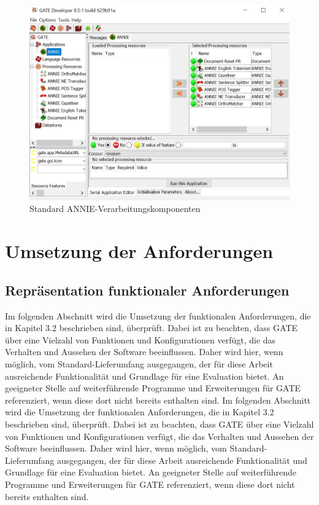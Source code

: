 \documentclass[12pt]{report}
\begin{document}
\begin{figure}[h!]
\begin{center}
\includegraphics[scale=0.8]{GATE_Bilder/ANNIE2.jpg}
\caption{Standard ANNIE-Verarbeitungskomponenten}
\end{center}
\end{figure}

\section{Umsetzung der Anforderungen}

\subsection{Repräsentation funktionaler Anforderungen}
Im folgenden Abschnitt wird die Umsetzung der funktionalen Anforderungen, die in Kapitel 3.2 beschrieben sind, überprüft. Dabei ist zu beachten, dass GATE über eine Vielzahl von Funktionen und Konfigurationen verfügt, die das Verhalten und Aussehen der Software beeinflussen. Daher wird hier, wenn möglich, vom Standard-Lieferumfang ausgegangen, der für diese Arbeit ausreichende Funktionalität und Grundlage für eine Evaluation bietet. An geeigneter Stelle auf weiterführende Programme und Erweiterungen für GATE referenziert, wenn diese dort nicht bereits enthalten sind.
Im folgenden Abschnitt wird die Umsetzung der funktionalen Anforderungen, die in Kapitel 3.2 beschrieben sind, überprüft. Dabei ist zu beachten, dass GATE über eine Vielzahl von Funktionen und Konfigurationen verfügt, die das Verhalten und Aussehen der Software beeinflussen. Daher wird hier, wenn möglich, vom Standard-Lieferumfang ausgegangen, der für diese Arbeit ausreichende Funktionalität und Grundlage für eine Evaluation bietet. An geeigneter Stelle auf weiterführende Programme und Erweiterungen für GATE referenziert, wenn diese dort nicht bereits enthalten sind.\\
\end{document}

